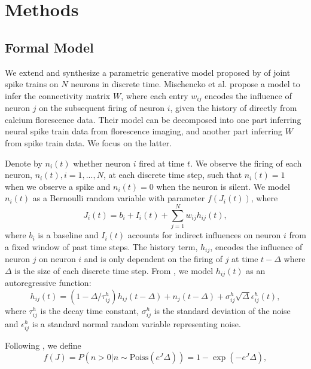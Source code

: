 \documentclass{article}
\begin{document}
\section{Methods}

\subsection{Formal Model}
We extend and synthesize a parametric generative model proposed by
\citep{mishchencko2011} of joint spike trains on $N$ neurons in
discrete time. Mischencko
et al. propose a model to infer the connectivity matrix $W$, where
each entry $w_{ij}$ encodes the influence of neuron $j$ on the subsequent
firing of neuron $i$, given the history of directly from calcium
florescence data. Their model can be decomposed into one part
inferring neural spike train data from florescence imaging, and
another part inferring $W$ from spike train data. We focus on the
latter.

Denote by $ n_i(t) $ whether neuron $i$ fired at time $t$. We observe
the firing of each neuron, $n_i(t), i = 1,...,N$, at each discrete time step, such that $n_i(t) = 1$ when we observe a spike and $n_i(t) = 0$ when the neuron is silent. We model $n_i(t)$ as a
Bernoulli random variable with parameter $f(J_i(t))$, where
\begin{equation}\label{J}J_i(t) = b_i + I_i(t) + \sum_{j=1}^{N}
w_{ij}h_{ij}(t), \end{equation} where $b_i$ is a baseline and $I_i(t)$
accounts for indirect influences on neuron $i$ from a fixed window of
past time steps. The history term, $h_{ij}$, encodes
the influence of neuron $j$ on neuron $i$ and is only dependent on the firing of $j$ at time $t-\Delta$ where $\Delta$ is the size of each discrete time step.
From \citep{mishchencko2011}, we model $h_{ij}(t)$ as an autoregressive function: \begin{equation}\label{h} h_{ij}(t) = (1-\Delta/\tau_{ij}^h)h_{ij}(t-\Delta)
  + n_j(t-\Delta)+\sigma_{ij}^h\sqrt{\Delta}\epsilon_{ij}^h(t), \end{equation}
where $ \tau_{ij}^h $ is the decay time constant, $\sigma_{ij}^h$ is the
standard deviation of the noise and $\epsilon_{ij}^h$ is a standard
normal random variable representing noise.

Following \citep{mishchencko2011}, we define \begin{equation}
\label{f} f(J) = P\left(n>0 | n \sim \text{Poiss}(e^J\Delta)\right) = 1 - \exp(-e^J\Delta), \end{equation}
\end{document}
